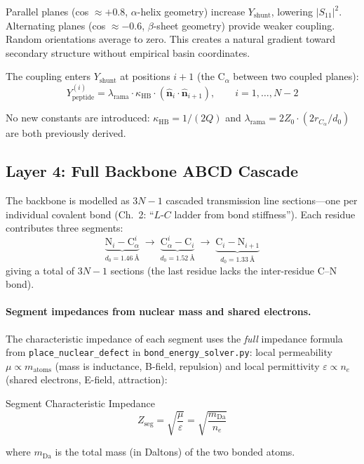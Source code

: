 Parallel planes (cos $\approx +0.8$, $\alpha$-helix geometry) increase $Y_\text{shunt}$, lowering $|S_{11}|^2$.  Alternating planes (cos $\approx -0.6$, $\beta$-sheet geometry) provide weaker coupling.  Random orientations average to zero.  This creates a natural gradient toward secondary structure without empirical basin coordinates.

The coupling enters $Y_\text{shunt}$ at positions $i+1$ (the C$_\alpha$ between two coupled planes):
\begin{equation}
    Y_\text{peptide}^{(i)} = \lambda_\text{rama} \cdot \kappa_\text{HB} \cdot (\hat{\mathbf{n}}_i \cdot \hat{\mathbf{n}}_{i+1}), \qquad i = 1, \ldots, N{-}2
    \label{eq:y_peptide}
\end{equation}

No new constants are introduced: $\kappa_\text{HB} = 1/(2Q)$ and $\lambda_\text{rama} = 2Z_0 \cdot (2r_{C_\alpha}/d_0)$ are both previously derived.

\subsection{Layer 4: Full Backbone ABCD Cascade}
\label{eq:abcd_section}

The backbone is modelled as $3N{-}1$ cascaded transmission line sections---one per individual covalent bond (Ch.~2: ``$L$-$C$ ladder from bond stiffness'').  Each residue contributes three segments:
\begin{equation}
    \underbrace{\text{N}_i \!-\! \text{C}_\alpha^i}_{d_0 = 1.46~\text{\AA}} \;\longrightarrow\;
    \underbrace{\text{C}_\alpha^i \!-\! \text{C}_i}_{d_0 = 1.52~\text{\AA}} \;\longrightarrow\;
    \underbrace{\text{C}_i \!-\! \text{N}_{i+1}}_{d_0 = 1.33~\text{\AA}}
    \label{eq:backbone_segments}
\end{equation}
giving a total of $3N{-}1$ sections (the last residue lacks the inter-residue C--N bond).

\paragraph{Segment impedances from nuclear mass and shared electrons.}
The characteristic impedance of each segment uses the \emph{full} impedance formula from \texttt{place\_nuclear\_defect} in \texttt{bond\_energy\_solver.py}: local permeability $\mu \propto m_{\text{atoms}}$ (mass is inductance, B-field, repulsion) and local permittivity $\varepsilon \propto n_e$ (shared electrons, E-field, attraction):
\begin{resultbox}{Segment Characteristic Impedance}
\begin{equation}
    Z_\text{seg} = \sqrt{\frac{\mu}{\varepsilon}} = \sqrt{\frac{m_\text{Da}}{n_e}}
    \label{eq:z_seg_full}
\end{equation}
\end{resultbox}
where $m_\text{Da}$ is the total mass (in Daltons) of the two bonded atoms.

